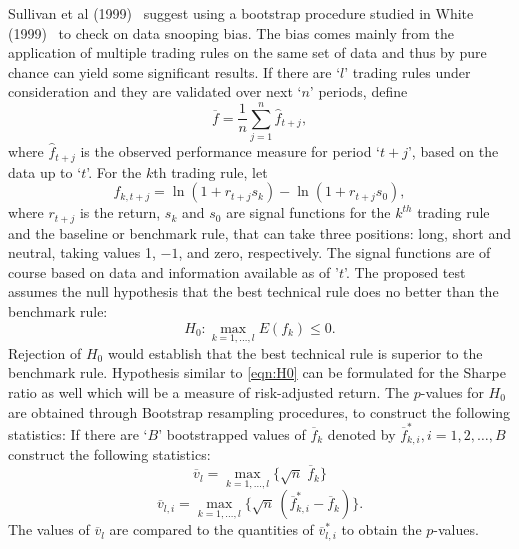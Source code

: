 Sullivan et al (1999)~\cite{sullivan1999data} suggest using a bootstrap procedure studied in White (1999)~\cite{white1999} to check on data snooping bias. The bias comes mainly from the application of multiple trading rules on the same set of data and thus by pure chance can yield some significant results. If there are `$l$' trading rules under consideration and they are validated over next `$n$' periods, define
	\begin{equation} \label{eqn:barf}
	\overline{f}= \frac{1}{n} \sum_{j=1}^n\hat{f}_{t+j},
	\end{equation}
where $\hat{f}_{t+j}$ is the observed performance measure for period `$t+j$', based on the data up to `$t$'. For the $k$th trading rule, let
	\begin{equation} \label{eqn:fktj}
	f_{k,t+j}= \ln(1+r_{t+j} s_k) - \ln(1+r_{t+j} s_0),
	\end{equation}
where $r_{t+j}$ is the return, $s_k$ and $s_0$ are signal functions for the $k^{th}$ trading rule and the baseline or benchmark rule, that can take three positions: long, short and neutral, taking values 1, $-1$, and zero, respectively. The signal functions are of course based on data and information available as of '$t$'. The proposed test assumes the null hypothesis that the best technical rule does no better than the benchmark rule:
	\begin{equation} \label{eqn:H0}
	H_0: \max_{k=1,\ldots,l} E(f_k) \leq 0.
	\end{equation}
Rejection of $H_0$ would establish that the best technical rule is superior to the benchmark rule. Hypothesis similar to \eqref{eqn:H0} can be formulated for the Sharpe ratio as well which will be a measure of risk-adjusted return. The $p$-values for $H_0$ are obtained through Bootstrap resampling procedures, to construct the following statistics:
If there are `$B$' bootstrapped values of $\overline{f}_k$ denoted by $\overline{f}_{k,i}^*, i=1,2,\ldots,B$ construct the following statistics:
	\begin{equation} \label{eqn:linev}
	\overline{v}_l = \max_{k=1,\ldots,l} \{\sqrt{n}\;\overline{f}_k\}
	\end{equation}
	\begin{equation} \label{eqn:linevli}
	\overline{v}_{l,i} = \max_{k=1,\ldots,l} \{\sqrt{n}\,(\overline{f}_{k,i}^* - \overline{f}_k) \}.
	\end{equation}
The values of $\overline{v}_l$ are compared to the quantities of $\overline{v}_{l,i}^*$ to obtain the $p$-values.


